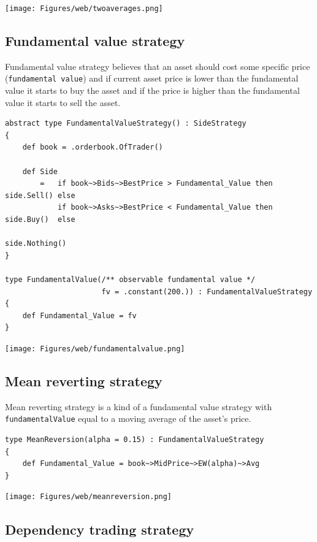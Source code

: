 \documentclass[a4paper,11pt]{article}
\begin{document}
\centerline{\texttt{[image: Figures/web/twoaverages.png]}}

\subsection{Fundamental value
strategy}\label{fundamental-value-strategy}

Fundamental value strategy believes that an asset should cost some
specific price (\texttt{fundamental value}) and if current asset price
is lower than the fundamental value it starts to buy the asset and if
the price is higher than the fundamental value it starts to sell the
asset.

\begin{verbatim}
abstract type FundamentalValueStrategy() : SideStrategy
{
    def book = .orderbook.OfTrader()

    def Side
        =   if book~>Bids~>BestPrice > Fundamental_Value then side.Sell() else
            if book~>Asks~>BestPrice < Fundamental_Value then side.Buy()  else
                                                              side.Nothing()
}

type FundamentalValue(/** observable fundamental value */
                      fv = .constant(200.)) : FundamentalValueStrategy
{
    def Fundamental_Value = fv
}
\end{verbatim}

\centerline{\texttt{[image: Figures/web/fundamentalvalue.png]}}

\subsection{Mean reverting strategy}\label{mean-reverting-strategy}

Mean reverting strategy is a kind of a fundamental value strategy with
\texttt{fundamentalValue} equal to a moving average of the asset's
price.

\begin{verbatim}
type MeanReversion(alpha = 0.15) : FundamentalValueStrategy
{
    def Fundamental_Value = book~>MidPrice~>EW(alpha)~>Avg
}
\end{verbatim}

\centerline{\texttt{[image: Figures/web/meanreversion.png]}}

\subsection{Dependency trading
strategy}\label{dependency-trading-strategy}
\end{document}
